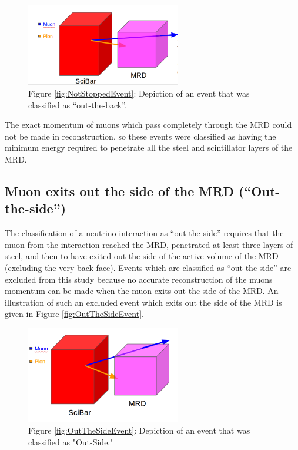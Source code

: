 \documentclass[11pt]{article}
\begin{document}
\begin{figure}[H]
\centering
\includegraphics[width=0.6\textwidth]{EventClassifications/NotStopped.png}
\caption*{Figure \ref*{fig:NotStoppedEvent}: Depiction of an event that was classified as ``out-the-back''.}
\end{figure}\label{fig:NotStoppedEvent}

The exact momentum of muons which pass completely through the MRD could not be made in reconstruction, so these events were classified as having the minimum energy required to penetrate all the steel and scintillator layers of the MRD.

\subsection{Muon exits out the side of the MRD (``Out-the-side'')}
The classification of a neutrino interaction as ``out-the-side'' requires that the muon from the interaction reached the MRD, penetrated at least three layers of steel, and then to have exited out the side of the active volume of the MRD (excluding the very back face). Events which are classified as ``out-the-side'' are excluded from this study because no accurate reconstruction of the muons momentum can be made when the muon exits out the side of the MRD. An illustration of such an excluded event which exits out the side of the MRD is given in Figure \ref*{fig:OutTheSideEvent}.


\begin{figure}[H]
\centering
\includegraphics[width=0.6\textwidth]{EventClassifications/OutSide.png}
\caption*{Figure \ref*{fig:OutTheSideEvent}: Depiction of an event that was classified as "Out-Side."}
\end{figure}\label{fig:OutTheSideEvent}
\end{document}
